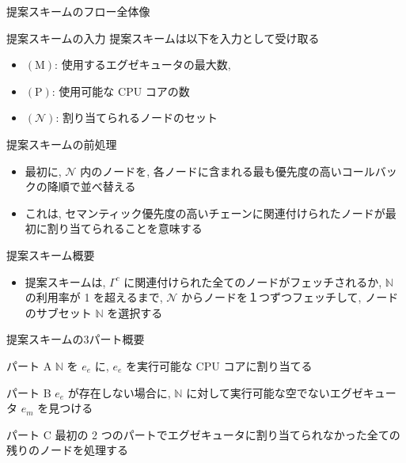 \begin{frame}{提案スキームのフロー全体像}
\end{frame}

\begin{frame}{提案スキームの入力}
    提案スキームは以下を入力として受け取る
    \begin{itemize}
        \item $(\mathrm{M})$: 使用するエグゼキュータの最大数,
        \item $(\mathrm{P})$: 使用可能な CPU コアの数
        \item $(\mathcal{N})$: 割り当てられるノードのセット
    \end{itemize}
\end{frame}

\begin{frame}{提案スキームの前処理}
    \begin{itemize}
        \item 最初に, $\mathcal{N}$ 内のノードを, 各ノードに含まれる最も優先度の高いコールバックの降順で並べ替える
        \item これは, セマンティック優先度の高いチェーンに関連付けられたノードが最初に割り当てられることを意味する
    \end{itemize}
\end{frame}

\begin{frame}{提案スキーム概要}
    \begin{itemize}
        \item 提案スキームは, $\Gamma^{c}$ に関連付けられた全てのノードがフェッチされるか, $\mathbb{N}$ の利用率が 1 を超えるまで, $\mathcal{N}$ からノードを１つずつフェッチして, ノードのサブセット $\mathbb{N}$ を選択する
    \end{itemize}
\end{frame}

\begin{frame}{提案スキームの3パート概要}
    \begin{block}{パート A}
        $\mathbb{N}$ を $e_{e}$ に, $e_{e}$ を実行可能な CPU コアに割り当てる
    \end{block}
    \begin{block}{パート B}
        $e_{e}$ が存在しない場合に, $\mathbb{N}$ に対して実行可能な空でないエグゼキュータ $e_{m}$ を見つける
    \end{block}
    \begin{block}{パート C}
        最初の 2 つのパートでエグゼキュータに割り当てられなかった全ての残りのノードを処理する
    \end{block}
\end{frame}

